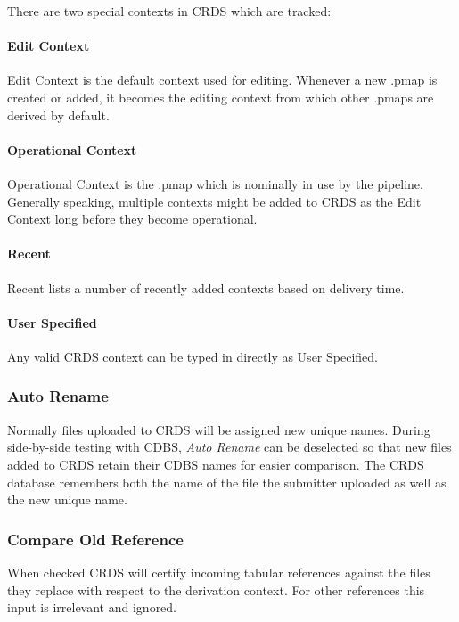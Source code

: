 \documentclass[letterpaper,10pt,english]{sphinxmanual}
\begin{document}
There are two special contexts in CRDS which are tracked:


\paragraph{Edit Context}
\label{web_site_use:edit-context}
Edit Context is the default context used for editing.   Whenever a new .pmap is created or
added,  it becomes the editing context from which other .pmaps are derived by
default.


\paragraph{Operational Context}
\label{web_site_use:operational-context}
Operational Context is the .pmap which is nominally in use by
the pipeline.  Generally speaking,  multiple contexts might be added to CRDS as
the Edit Context long before they become operational.


\paragraph{Recent}
\label{web_site_use:recent}
Recent lists a number of recently added contexts based on delivery time.


\paragraph{User Specified}
\label{web_site_use:user-specified}
Any valid CRDS context can be typed in directly as User Specified.


\subsubsection{Auto Rename}
\label{web_site_use:auto-rename}
Normally files uploaded to CRDS will be assigned new unique names.   During side-by-side
testing with CDBS,  \emph{Auto Rename} can be deselected so that new files added to CRDS
retain their CDBS names for easier comparison.  The CRDS database remembers both
the name of the file the submitter uploaded as well as the new unique name.


\subsubsection{Compare Old Reference}
\label{web_site_use:compare-old-reference}
When checked CRDS will certify incoming tabular references against the files
they replace with respect to the derivation context.   For other references this
input is irrelevant and ignored.
\end{document}
